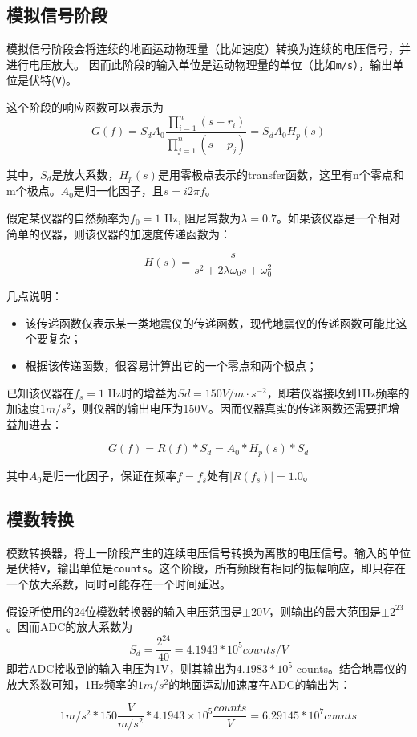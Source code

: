 \subsection{模拟信号阶段}
模拟信号阶段会将连续的地面运动物理量（比如速度）转换为连续的电压信号，并进行电压放大。
因而此阶段的输入单位是运动物理量的单位（比如\verb+m/s+），输出单位是伏特(\verb+V+)。

这个阶段的响应函数可以表示为
\[
    G(f)=S_d A_0 \frac{\prod_{i=1}^{n} (s-r_i)}{\prod_{j=1}^{n} (s-p_j)}=S_d A_0 H_p(s)
\]

其中，$S_d$是放大系数，$H_p(s)$是用零极点表示的transfer函数，这里有n个零点和m个极点。$A_0$是归一化因子，且$s=i 2\pi f$。

假定某仪器的自然频率为$f_0=1$ Hz, 阻尼常数为$\lambda=0.7$。如果该仪器是一个相对简单的仪器，则该仪器的加速度传递函数为：

\[
    H(s) = \frac{s}{s^2+2\lambda \omega_0 s + \omega_0^2}
\]

几点说明：
\begin{itemize}
\item 该传递函数仅表示某一类地震仪的传递函数，现代地震仪的传递函数可能比这个要复杂；
\item 根据该传递函数，很容易计算出它的一个零点和两个极点；
\end{itemize}

已知该仪器在$f_s=1$ Hz时的增益为$Sd=150 V/m \cdot s^{-2}$，即若仪器接收到1Hz频率的加速度$1 m/s^2$，则仪器的输出电压为150V。因而仪器真实的传递函数还需要把增益加进去：

\[
    G(f) = R(f)*S_d = A_0*H_p(s)*S_d
\]

其中$A_0$是归一化因子，保证在频率$f=f_s$处有$|R(f_s)|=1.0$。

\subsection{模数转换}
模数转换器，将上一阶段产生的连续电压信号转换为离散的电压信号。输入的单位是伏特\verb+V+，输出单位是\verb+counts+。这个阶段，所有频段有相同的振幅响应，即只存在一个放大系数，同时可能存在一个时间延迟。

假设所使用的24位模数转换器的输入电压范围是$\pm 20 V$，则输出的最大范围是$\pm 2^{23}$。因而ADC的放大系数为
\[
    S_d = \frac{2^{24}}{40} = 4.1943*10^{5} counts/V
\]
即若ADC接收到的输入电压为1V，则其输出为$4.1983*10^5$ counts。结合地震仪的放大系数可知，1Hz频率的$1 m/s^2$的地面运动加速度在ADC的输出为：

\[
    1 m/s^2 * 150 \frac{V}{m/s^2} * 4.1943\times 10^5 \frac{counts}{V} = 6.29145*10^7 counts
\]


